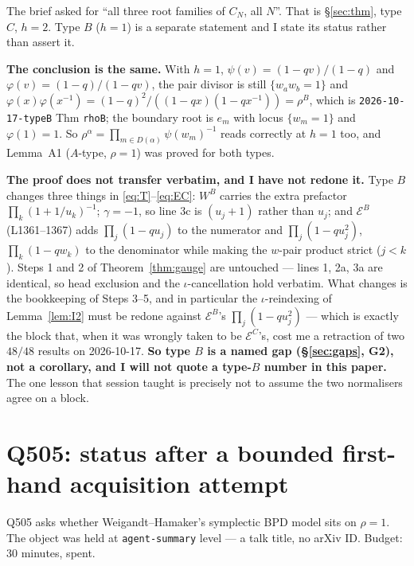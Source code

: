 \documentclass[11pt]{article}
\theoremstyle{definition}
\begin{document}
The brief asked for ``all three root families of $C_N$, all $N$''.  That is
\S\ref{sec:thm}, type $C$, $h=2$.  Type $B$ ($h=1$) is a separate statement and I
state its status rather than assert it.

\textbf{The conclusion is the same.}  With $h=1$, $\psi(v)=(1-qv)/(1-q)$ and
$\varphi(v)=(1-q)/(1-qv)$, the pair divisor is still $\{w_aw_b=1\}$ and
$\varphi(x)\varphi(x^{-1})=(1-q)^2/((1-qx)(1-qx^{-1}))=\rho^{B}$, which is
\texttt{2026-10-17-typeB} Thm \texttt{rhoB}; the boundary root is $e_m$ with
locus $\{w_m=1\}$ and $\varphi(1)=1$.  So
$\rho^{\alpha}=\prod_{m\in D(\alpha)}\psi(w_m)^{-1}$ reads correctly at $h=1$
too, and Lemma~A1 ($A$-type, $\rho=1$) was proved for both types.

\textbf{The proof does not transfer verbatim, and I have not redone it.}  Type
$B$ changes three things in \eqref{eq:T}--\eqref{eq:EC}: $W^{B}$ carries the
extra prefactor $\prod_k(1+1/u_k)^{-1}$; $\gamma=-1$, so line 3c is
$(u_j+1)$ rather than $u_j$; and $\mathcal{E}^{B}$ (L1361--1367) adds
$\prod_j(1-qu_j)$ to the numerator and $\prod_j(1-qu_j^{2})$,
$\prod_k(1-qw_k)$ to the denominator while making the $w$-pair product strict
($j<k$).  Steps 1 and 2 of Theorem~\ref{thm:gauge} are untouched --- lines 1,
2a, 3a are identical, so head exclusion and the $\iota$-cancellation hold
verbatim.  What changes is the bookkeeping of Steps 3--5, and in particular the
$\iota$-reindexing of Lemma~\ref{lem:I2} must be redone against
$\mathcal{E}^{B}$'s $\prod_j(1-qu_j^{2})$ --- which is exactly the block that,
when it was wrongly taken to be $\mathcal{E}^{C}$'s, cost me a retraction of two
$48/48$ results on 2026-10-17.  \textbf{So type $B$ is a named gap
(\S\ref{sec:gaps}, G2), not a corollary, and I will not quote a type-$B$ number
in this paper.}  The one lesson that session taught is precisely not to assume
the two normalisers agree on a block.

\section{Q505: status after a bounded first-hand acquisition attempt}
\label{sec:q505}

Q505 asks whether Weigandt--Hamaker's symplectic BPD model sits on $\rho=1$.
The object was held at \texttt{agent-summary} level --- a talk title, no arXiv
ID.  Budget: 30 minutes, spent.
\end{document}
